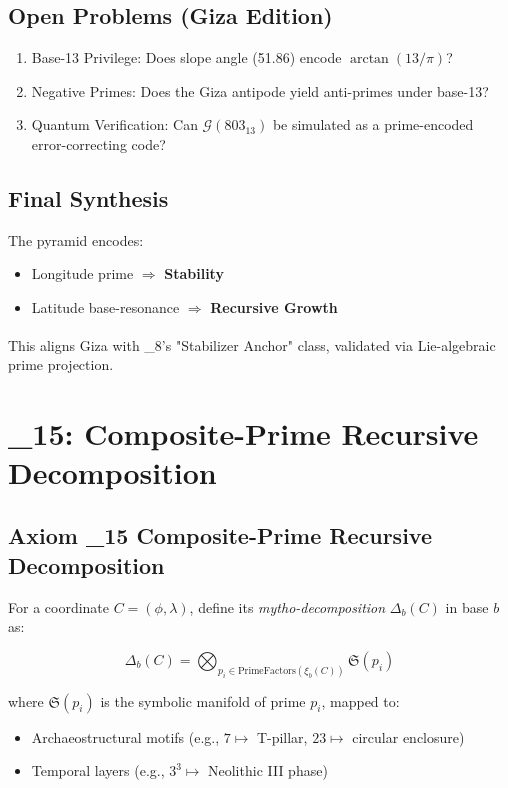 \documentclass[12]{amsart}
\theoremstyle{plain}
\begin{document}
\subsection{Open Problems (Giza Edition)}
\begin{enumerate}
    \item Base-13 Privilege: Does slope angle (51.86\degree) encode $\arctan(13/\pi)$?
    \item Negative Primes: Does the Giza antipode yield anti-primes under base-13?
    \item Quantum Verification: Can $\mathcal{G}(803_{13})$ be simulated as a prime-encoded error-correcting code?
\end{enumerate}

\subsection{Final Synthesis}
The pyramid encodes:
\begin{itemize}
    \item Longitude prime $\Rightarrow$ \textbf{Stability}
    \item Latitude base-resonance $\Rightarrow$ \textbf{Recursive Growth}
\end{itemize}

This aligns Giza with \Xi_8\textsuperscript{\prime}'s "Stabilizer Anchor" class, validated via Lie-algebraic prime projection.

\section{\Xi_{15}: Composite-Prime Recursive Decomposition}

\subsection{Axiom \Xi_{15} \textendash{} Composite-Prime Recursive Decomposition}

For a coordinate $C = (\phi, \lambda)$, define its \textit{mytho-decomposition} $\Delta_b(C)$ in base $b$ as:

\[
\Delta_b(C) = \bigotimes_{p_i \in \text{PrimeFactors}(\xi_b(C))} \mathfrak{S}(p_i)
\]

where $\mathfrak{S}(p_i)$ is the symbolic manifold of prime $p_i$, mapped to:
\begin{itemize}
    \item Archaeostructural motifs (e.g., $7 \mapsto$ T-pillar, $23 \mapsto$ circular enclosure)
    \item Temporal layers (e.g., $3^3 \mapsto$ Neolithic III phase)
\end{itemize}
\end{document}
